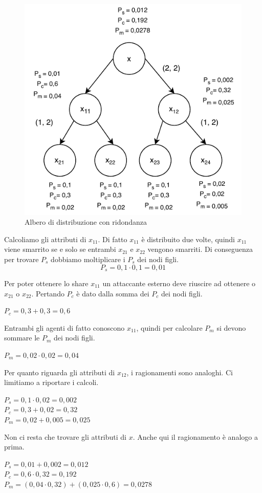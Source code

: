 \begin{figure}[H]
	\centering
	\includegraphics[width=0.55\linewidth]{images/chap_analisi_robustezza/robustezza-2-2.pdf}
	\caption{Albero di distribuzione con ridondanza}
	\label{fig:robustezza-2-2}
\end{figure}

Calcoliamo gli attributi di $ x_{11} $. Di fatto $ x_{11} $ è distribuito due volte, quindi
$ x_{11} $ viene smarrito se e solo se entrambi $ x_{21} $ e $ x_{22} $ vengono smarriti.
Di conseguenza per trovare
$ P_s $ dobbiamo moltiplicare i $ P_s $ dei nodi figli.
$$ P_s = 0,1 \cdot 0,1 = 0,01 $$


Per poter ottenere lo share $ x_{11} $ un attaccante esterno deve riuscire ad ottenere
o $ x_{21} $ o $ x_{22} $. Pertando $ P_c $ è dato dalla somma dei $ P_c $ dei nodi figli.
\begin{tightcenter}
	$ P_c = 0,3 + 0,3 = 0,6 $
\end{tightcenter}

Entrambi gli agenti di fatto conoscono $ x_{11} $, quindi per calcolare $ P_m $ si devono
sommare le $ P_m $ dei nodi figli.
\begin{tightcenter}
	$ P_m = 0,02 \cdot 0,02 = 0,04$
\end{tightcenter}

Per quanto riguarda gli attributi di $ x_{12} $, i ragionamenti sono analoghi. Ci limitiamo
a riportare i calcoli.
\begin{tightcenter}
	$ P_s = 0,1 \cdot 0,02 = 0,002 $\\
	$ P_c = 0,3 + 0,02 = 0,32 $\\
	$ P_m = 0,02 + 0,005 = 0,025 $
\end{tightcenter}

Non ci resta che trovare gli attributi di $ x $.
Anche qui il ragionamento è analogo a prima.
\begin{tightcenter}
	$ P_s = 0,01 + 0,002 = 0,012 $\\
	$ P_c = 0,6 \cdot 0,32 = 0,192 $\\
	$ P_m = (0,04 \cdot 0,32) + (0,025 \cdot 0,6) = 0,0278 $\\
\end{tightcenter}


